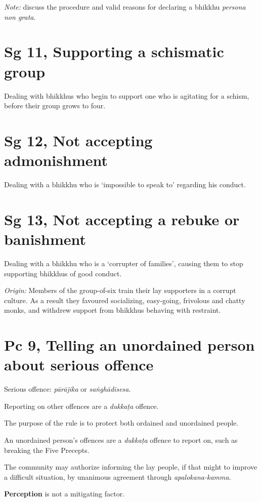 \emph{Note:} discuss the procedure and valid reasons for declaring a
bhikkhu \emph{persona non grata}.

\section{Sg 11, Supporting a schismatic group}

Dealing with bhikkhus who begin to support one who is agitating for a
schism, before their group grows to four.

\section{Sg 12, Not accepting admonishment}

Dealing with a bhikkhu who is `impossible to speak to' regarding his
conduct.

\section{Sg 13, Not accepting a rebuke or banishment}

Dealing with a bhikkhu who is a `corrupter of families', causing them to
stop supporting bhikkhus of good conduct.

\emph{Origin:} Members of the group-of-six train their lay supporters in
a corrupt culture. As a result they favoured socializing, easy-going,
frivolous and chatty monks, and withdrew support from bhikkhus behaving
with restraint.

\section{Pc 9, Telling an unordained person about serious offence}

Serious offence: \emph{pārājika} or \emph{saṅghādisesa}.

Reporting on other offences are a \emph{dukkaṭa} offence.

The purpose of the rule is to protect both ordained and unordained
people.

An unordained person's offences are a \emph{dukkaṭa} offence to report
on, such as breaking the Five Precepts.

The community may authorize informing the lay people, if that might to
improve a difficult situation, by unanimous agreement through
\emph{apalokana-kamma}.

\textbf{Perception} is not a mitigating factor.

